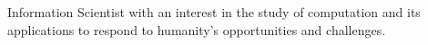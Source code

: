 

\begin{cvparagraph}

Information Scientist with an interest in the study of computation and its applications to respond to humanity's opportunities and challenges.
\end{cvparagraph}

